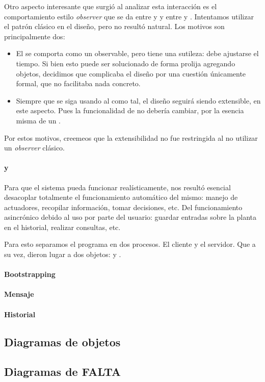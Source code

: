   Otro aspecto interesante que surgi\'o al analizar esta interacci\'on es
  el comportamiento estilo \textit{observer} que se da entre \timer y
  \condiciones y entre \timer y \decisiones. Intentamos utilizar el patr\'on
  cl\'asico en el dise\~no, pero no result\'o natural. Los motivos son
  principalmente dos:
  \begin{itemize}
      \item El \timer se comporta como un observable, pero tiene una sutileza:
          debe ajustarse el tiempo. Si bien esto puede ser solucionado de
          forma prolija agregando objetos, decidimos que complicaba el dise\~no
          por una cuesti\'on \'unicamente formal, que no facilitaba nada
          concreto.
      \item Siempre que se siga usando al \timer como tal, el dise\~no seguir\'a
          siendo extensible, en este aspecto. Pues la funcionalidad de \timer
          no deber\'ia cambiar, por la esencia misma de un \timer.
  \end{itemize}
  Por estos motivos, creemeos que la extensibilidad no fue restringida al
  no utilizar un \textit{observer} cl\'asico.




  \paragraph{\cliente y \servidor}
  Para que el sistema pueda funcionar real\'isticamente, nos result\'o esencial
  desacoplar totalmente el funcionamiento autom\'atico del mismo: manejo de
  actuadores, recopilar informaci\'on, tomar decisiones, etc. Del funcionamiento
  asincr\'onico debido al uso por parte del usuario: guardar entradas sobre la
  planta en el historial, realizar consultas, etc.

  Para esto separamos el programa en dos procesos. El cliente y el servidor.
  Que a su vez, dieron lugar a dos objetos: \cliente y \servidor.

  \paragraph{Bootstrapping}

  \paragraph{Mensaje}

  \paragraph{Historial}

  \subsection{Diagramas de objetos}

  \subsection{Diagramas de FALTA}

